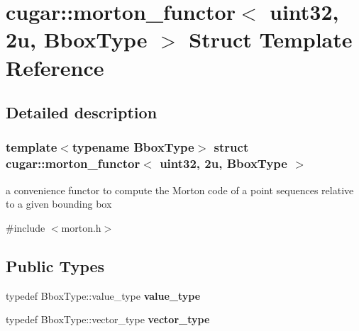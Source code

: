 \hypertarget{structcugar_1_1morton__functor_3_01uint32_00_012u_00_01_bbox_type_01_4}{}\section{cugar\+:\+:morton\+\_\+functor$<$ uint32, 2u, Bbox\+Type $>$ Struct Template Reference}
\label{structcugar_1_1morton__functor_3_01uint32_00_012u_00_01_bbox_type_01_4}


\subsection{Detailed description}
\subsubsection*{template$<$typename Bbox\+Type$>$\newline
struct cugar\+::morton\+\_\+functor$<$ uint32, 2u, Bbox\+Type $>$}

a convenience functor to compute the Morton code of a point sequences relative to a given bounding box 

{\ttfamily \#include $<$morton.\+h$>$}

\subsection*{Public Types}
\begin{DoxyCompactItemize}
\item 
\mbox{\label{structcugar_1_1morton__functor_3_01uint32_00_012u_00_01_bbox_type_01_4_a745fd0a7750f5c4f4b2c69bb4ffb0c35}} 
typedef Bbox\+Type\+::value\+\_\+type {\bfseries value\+\_\+type}
\item 
\mbox{\label{structcugar_1_1morton__functor_3_01uint32_00_012u_00_01_bbox_type_01_4_a005e75c1506a4240601b699fc387857b}} 
typedef Bbox\+Type\+::vector\+\_\+type {\bfseries vector\+\_\+type}
\end{DoxyCompactItemize}
